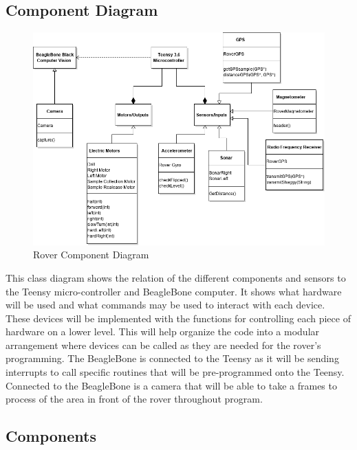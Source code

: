 \documentclass[journal,10pt,draftclsnofoot,onecolumn,compsoc]{IEEEtran} \usepackage[margin=0.75in]{geometry}
\begin{document}
\subsection{Component Diagram}
\vspace{1cm}
\begin{figure}[ht]
    \centering
    \includegraphics[width = 1 \textwidth,angle=0]{ClassDiag.png}
    \caption{Rover Component Diagram}
    \label{fig:my_label}
\end{figure}
\vspace{1cm}

This class diagram shows the relation of the different components and sensors to the Teensy micro-controller and BeagleBone computer. It shows what hardware will be used and what commands may be used to interact with each device. These devices will be implemented with the functions for controlling each piece of hardware on a lower level. This will help organize the code into a modular arrangement where devices can be called as they are needed for the rover's programming. The BeagleBone is connected to the Teensy as it will be sending interrupts to call specific routines that will be pre-programmed onto the Teensy. Connected to the BeagleBone is a camera that will be able to take a frames to process of the area in front of the rover throughout program.

\subsection{Components}
\end{document}
